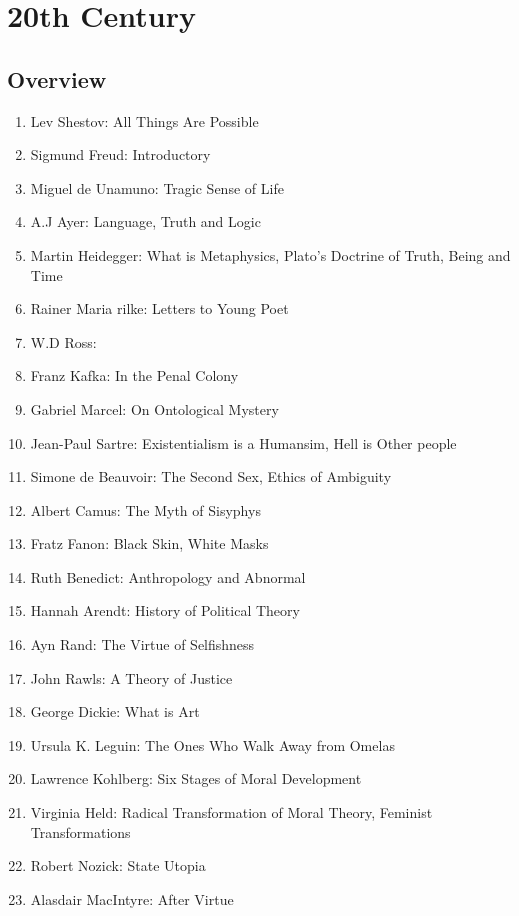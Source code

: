 \documentclass{article}
\begin{document}
\section{20th Century}

\subsection{Overview}%
\label{sub:Overview}

\begin{enumerate}
    \item Lev Shestov: All Things Are Possible
    \item Sigmund Freud: Introductory
    \item Miguel de Unamuno: Tragic Sense of Life
    \item A.J Ayer: Language, Truth and Logic
    \item Martin Heidegger: What is Metaphysics, Plato's Doctrine of Truth, Being and Time
    \item Rainer Maria rilke: Letters to Young Poet
    \item W.D Ross:
    \item Franz Kafka: In the Penal Colony
    \item Gabriel Marcel: On Ontological Mystery
    \item Jean-Paul Sartre: Existentialism is a Humansim, Hell is Other people
    \item Simone de Beauvoir: The Second Sex, Ethics of Ambiguity
    \item Albert Camus: The Myth of Sisyphys
    \item Fratz Fanon: Black Skin, White Masks
    \item Ruth Benedict: Anthropology and Abnormal
    \item Hannah Arendt: History of Political Theory
    \item Ayn Rand: The Virtue of Selfishness
    \item John Rawls: A Theory of Justice
    \item George Dickie: What is Art
    \item Ursula K. Leguin: The Ones Who Walk Away from Omelas
    \item Lawrence Kohlberg: Six Stages of Moral Development
    \item Virginia Held: Radical Transformation of Moral Theory, Feminist Transformations
    \item Robert Nozick: State Utopia
    \item Alasdair MacIntyre: After Virtue

\end{enumerate}
\end{document}
